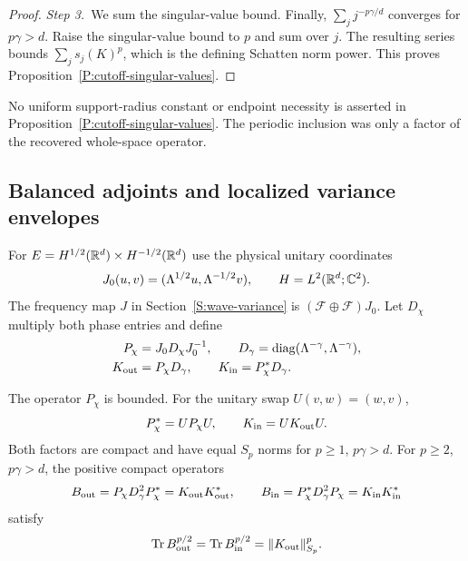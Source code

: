 \begin{proof}
  \medskip
  \noindent\textit{Step 3.~}We sum the singular-value bound.
  Finally, $\sum_j j^{-p\gamma/d}$ converges for $p\gamma > d$.
  Raise the singular-value bound to $p$ and sum over $j$. The resulting series
  bounds $\sum_j s_j(K)^p$, which is the defining Schatten norm power. This
  proves
  Proposition~\ref{P:cutoff-singular-values}.
\end{proof}

No uniform support-radius constant or endpoint necessity is asserted in
Proposition~\ref{P:cutoff-singular-values}. The periodic inclusion was only a
factor of the recovered whole-space operator.

\subsection{Balanced adjoints and localized variance envelopes}

For $E = H^{1/2}(\mathbb{R}^d)\times H^{-1/2}(\mathbb{R}^d)$ use the physical unitary
coordinates
\[
  J_0(u,v)=(\Lambda^{1/2}u,\Lambda^{-1/2}v),\qquad
  H=L^2(\mathbb{R}^d;\mathbb{C}^2).
\]
The frequency map $J$ in Section~\ref{S:wave-variance} is
$(\mathcal{F}\oplus\mathcal{F})J_0$. Let $D_\chi$ multiply both phase entries
and define
\begin{align}
  P_\chi&=J_0D_\chi J_0^{-1},\qquad
  D_\gamma=\operatorname{diag}(\Lambda^{-\gamma},\Lambda^{-\gamma}),
  \label{E:compact-balanced-cutoff}\\
  K_{\rm out}&=P_\chi D_\gamma,\qquad
  K_{\rm in}=P_\chi^*D_\gamma.
  \label{E:compact-two-factors}
\end{align}

\begin{proposition}\label{P:compact-two-envelopes}
  The operator $P_\chi$ is bounded. For the unitary swap $U(v,w) = (w,v)$,
  \[
    P_\chi^*=UP_\chi U,\qquad K_{\rm in}=UK_{\rm out}U.
  \]
  Both factors are compact and have equal $S_p$ norms for $p \ge 1$, $p\gamma >
  d$. For $p \ge 2$, $p\gamma > d$, the positive compact operators
  \[
    B_{\rm out}=P_\chi D_\gamma^2P_\chi^*=K_{\rm out}K_{\rm out}^*,
    \qquad B_{\rm in}=P_\chi^*D_\gamma^2P_\chi=K_{\rm in}K_{\rm in}^*
  \]
  satisfy
  \begin{equation}\label{E:compact-envelope-traces}
    \operatorname{Tr}B_{\rm out}^{p/2}
    =\operatorname{Tr}B_{\rm in}^{p/2}=\|K_{\rm out}\|_{S_p}^p.
  \end{equation}
\end{proposition}

